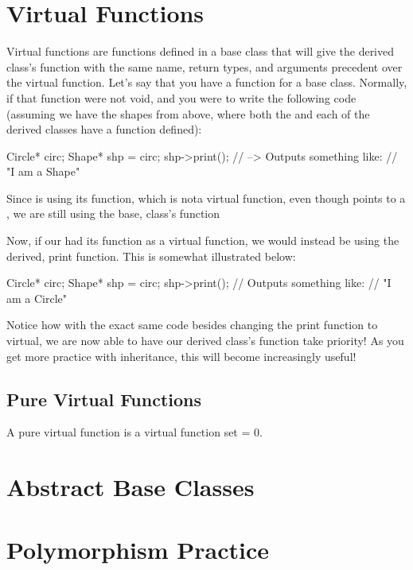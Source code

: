 \documentclass{tufte-handout}
\begin{document}
\section{Virtual Functions}

Virtual functions are functions defined in a base class that will give the derived class's function with the same name, return types, and arguments precedent over the virtual function.
Let's say that you have a  function for a base class.
Normally, if that function were not void, and you were to write the following code (assuming we have the shapes from above, where both the  and each of the derived classes have a  function defined):
\begin{Code}
    Circle* circ;
    Shape* shp = circ;
    shp->print();
    // --> Outputs something like:
    // "I am a Shape"
    
\end{Code}

Since  is using its  function, which is nota virtual function, even though  points to a , we are still using the base,  class's  function

Now, if our  had its  function as a virtual function, we would instead be using the derived,  print function.
This is somewhat illustrated below:

\begin{Code}
    Circle* circ;
    Shape* shp = circ;
    shp->print();
    // Outputs something like:
    // "I am a Circle"
\end{Code}
Notice how with the exact same code besides changing the print function to virtual, we are now able to have our derived class's function take priority!
As you get more practice with inheritance, this will become increasingly useful!


\subsection{Pure Virtual Functions}
A pure virtual function is a virtual function set = 0.
\section{Abstract Base Classes}

\section{Polymorphism Practice}
\end{document}
